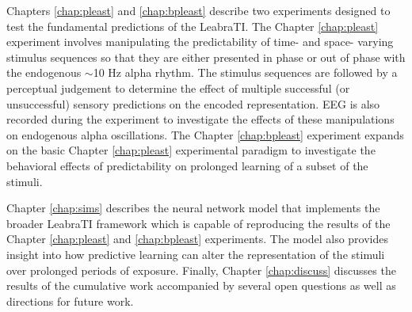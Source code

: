 \documentclass[dwyatte_dissertation.tex]{subfiles}
\begin{document}
Chapters \ref{chap:pleast} and \ref{chap:bpleast} describe two experiments designed to test the fundamental predictions of the LeabraTI. The Chapter \ref{chap:pleast} experiment involves manipulating the predictability of time- and space- varying stimulus sequences so that they are either presented in phase or out of phase with the endogenous $\sim$10 Hz alpha rhythm. The stimulus sequences are followed by a perceptual judgement to determine the effect of multiple successful (or unsuccessful) sensory predictions on the encoded representation. EEG is also recorded during the experiment to investigate the effects of these manipulations on endogenous alpha oscillations. The Chapter \ref{chap:bpleast} experiment expands on the basic Chapter \ref{chap:pleast} experimental paradigm to investigate the behavioral effects of predictability on prolonged learning of a subset of the stimuli.

Chapter \ref{chap:sims} describes the neural network model that implements the broader LeabraTI framework which is capable of reproducing the results of the Chapter \ref{chap:pleast} and \ref{chap:bpleast} experiments. The model also provides insight into how predictive learning can alter the representation of the stimuli over prolonged periods of exposure. Finally, Chapter \ref{chap:discuss} discusses the results of the cumulative work accompanied by several open questions as well as directions for future work.
\end{document}
